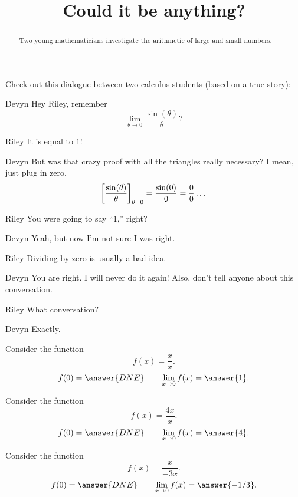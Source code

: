 \documentclass{ximera}
\title[Break-Ground:]{Could it be anything?}
\begin{document}
\begin{abstract}
Two young mathematicians investigate the arithmetic of large
and small numbers.
\end{abstract}
\maketitle


Check out this dialogue between two calculus students (based on a true
story):


\begin{dialogue}
\item[Devyn] Hey Riley, remember
  \[
  \lim_{\theta\to 0}\frac{\sin(\theta)}{\theta}?
  \]
\item[Riley] It is equal to $1$!
\item[Devyn] But was that crazy proof with all the triangles really
  necessary? I mean, just plug in zero. 
  \[
  \bigg[ \frac{\sin(\theta)}{\theta} \bigg]_{\theta=0} = \frac{\sin(0)}{0}=\frac{0}{0}\dots
  \]
  \item[Riley] You were going to say ``$1$,'' right? 
  \item[Devyn] Yeah, but now I'm not sure I was right.
  \item[Riley] Dividing by zero is usually a bad idea.
  \item[Devyn] You are right. I will never do it again! Also, don't
    tell anyone about this conversation.
  \item[Riley] What conversation?
  \item[Devyn] Exactly.
\end{dialogue}



\begin{problem}
  Consider the function
  \[
  f(x) = \frac{x}{x}.
  \]
  \[
  f(0) = \answer{DNE}\qquad\lim_{x\to 0} f(x) = \answer{1}.
  \]
\end{problem}

\begin{problem}
  Consider the function
  \[
  f(x) = \frac{4x}{x}.
  \]
  \[
  f(0) = \answer{DNE}\qquad\lim_{x\to 0} f(x) = \answer{4}.
  \]
\end{problem}

\begin{problem}
  Consider the function
  \[
  f(x) = \frac{x}{-3x}.
  \]
  \[
  f(0) = \answer{DNE}\qquad\lim_{x\to 0} f(x) = \answer{-1/3}.
  \]
\end{problem}

%
\end{document}

